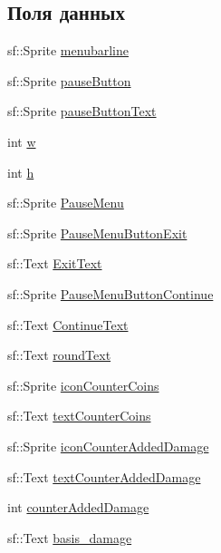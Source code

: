 \subsection*{Поля данных}
\begin{DoxyCompactItemize}
\item 
sf\+::\+Sprite \hyperlink{classMenuBar_a7c9348add51432373a0ac9ba34e0cc4a}{menubarline}
\item 
sf\+::\+Sprite \hyperlink{classMenuBar_a607b5c0461ef7951f3c0476bfd2ff00f}{pause\+Button}
\item 
sf\+::\+Sprite \hyperlink{classMenuBar_a68d781e6301956723cf9826650ad7d2c}{pause\+Button\+Text}
\item 
int \hyperlink{classMenuBar_a3e9680e7db9109858b09c1ade97fd5d4}{w}
\item 
int \hyperlink{classMenuBar_a47f733e89c961de1ff15c2534b2c6f9b}{h}
\item 
sf\+::\+Sprite \hyperlink{classMenuBar_a8ba645ebcb1785788ea4763822fac236}{Pause\+Menu}
\item 
sf\+::\+Sprite \hyperlink{classMenuBar_a985fe3e19ae94063f676bcedab881b21}{Pause\+Menu\+Button\+Exit}
\item 
sf\+::\+Text \hyperlink{classMenuBar_ae9cd84f5d9a3b53d45b27cae6a7c44e6}{Exit\+Text}
\item 
sf\+::\+Sprite \hyperlink{classMenuBar_a85b1a76501dd0d2ab5989a36b18299f2}{Pause\+Menu\+Button\+Continue}
\item 
sf\+::\+Text \hyperlink{classMenuBar_aa01962756e77381b16471f863ed3c9c0}{Continue\+Text}
\item 
sf\+::\+Text \hyperlink{classMenuBar_af2f5d854bc3f91aec40595f84c232be3}{round\+Text}
\item 
sf\+::\+Sprite \hyperlink{classMenuBar_a05af15dc315210fef5dc78cd30a1e213}{icon\+Counter\+Coins}
\item 
sf\+::\+Text \hyperlink{classMenuBar_ade87fea2a3773189c1c984f78598354f}{text\+Counter\+Coins}
\item 
sf\+::\+Sprite \hyperlink{classMenuBar_a4bd5e603c2fc8611f804f69d82786077}{icon\+Counter\+Added\+Damage}
\item 
sf\+::\+Text \hyperlink{classMenuBar_a91e93f244c42b092b1ac1708ad2376e0}{text\+Counter\+Added\+Damage}
\item 
int \hyperlink{classMenuBar_aca77c1b966ce3084c899dab8268cefc5}{counter\+Added\+Damage}
\item 
sf\+::\+Text \hyperlink{classMenuBar_a3093b55d6033fe43bf05afa0c6c9b1a8}{basis\+\_\+damage}
\end{DoxyCompactItemize}


